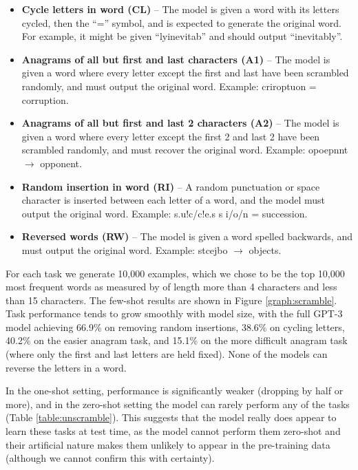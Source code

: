 \begin{itemize}
    \item \textbf{Cycle letters in word (CL)} -- The model is given a word with its letters cycled, then the ``='' symbol, and is expected to generate the original word.  For example, it might be given ``lyinevitab'' and should output ``inevitably''.
    \item \textbf{Anagrams of all but first and last characters (A1)} -- The model is given a word where every letter except the first and last have been scrambled randomly, and must output the original word.  Example: criroptuon = corruption.
    \item \textbf{Anagrams of all but first and last 2 characters (A2)} -- The model is given a word where every letter except the first 2 and last 2 have been scrambled randomly, and must recover the original word.  Example: opoepnnt $\to$ opponent.
    \item \textbf{Random insertion in word (RI)} -- A random punctuation or space character is inserted between each letter of a word, and the model must output the original word.  Example: s.u!c/c!e.s s i/o/n = succession.
    \item \textbf{Reversed words (RW)} -- The model is given a word spelled backwards, and must output the original word.  Example: stcejbo $\to$ objects.
\end{itemize}

For each task we generate 10,000 examples, which we chose to be the top 10,000 most frequent words as measured by \cite{norvig2009ngram} of length more than 4 characters and less than 15 characters. The few-shot results are shown in Figure \ref{graph:scramble}.  Task performance tends to grow smoothly with model size, with the full GPT-3 model achieving 66.9\% on removing random insertions, 38.6\% on cycling letters, 40.2\% on the easier anagram task, and 15.1\% on the more difficult anagram task (where only the first and last letters are held fixed).  None of the models can reverse the letters in a word. 

In the one-shot setting, performance is significantly weaker (dropping by half or more), and in the zero-shot setting the model can rarely perform any of the tasks (Table \ref{table:unscramble}).  This suggests that the model really does appear to learn these tasks at test time, as the model cannot perform them zero-shot and their artificial nature makes them unlikely to appear in the pre-training data (although we cannot confirm this with certainty).

